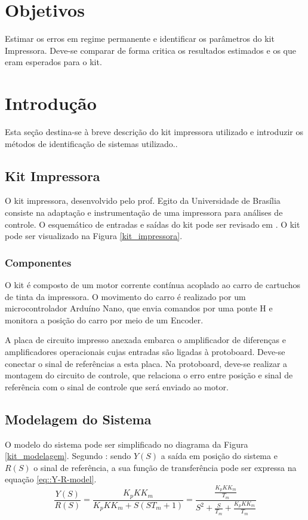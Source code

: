 \section{Objetivos}

Estimar os erros em regime permanente e identificar os parâmetros do kit Impressora. Deve-se comparar de forma critica os resultados estimados e os que eram esperados para o kit.

\section{Introdução}
Esta seção destina-se à breve descrição do kit impressora utilizado e introduzir os métodos de identificação de sistemas utilizado..

\subsection{Kit Impressora}
O kit impressora, desenvolvido pelo prof. Egito da Universidade de Brasília consiste na adaptação e instrumentação de uma impressora para análises de controle.  O esquemático de entradas e saídas do kit pode ser revisado em \cite{CDIN:Roteiro1}. O kit pode ser visualizado na Figura \ref{kit_impressora}.



\subsubsection{Componentes}
O kit é composto de um motor  corrente contínua acoplado ao carro de cartuchos de tinta da impressora. O movimento do carro é realizado por um microcontrolador Arduíno Nano, que envia comandos por uma ponte H e monitora a posição do carro por meio de um Encoder. 

A placa de circuito impresso anexada embarca o amplificador de diferenças e amplificadores operacionais cujas entradas são ligadas à protoboard. Deve-se conectar o sinal de referências a esta placa. Na protoboard, deve-se realizar a montagem do circuito de controle, que relaciona o erro entre posição e sinal de referência com o sinal de controle que será enviado ao motor.

\subsection{Modelagem do Sistema}
O modelo do sistema pode ser simplificado no diagrama da Figura \ref{kit_modelagem}. Segundo \cite{CDIN:Roteiro1}: sendo $Y(S)$ a saída em posição do sistema e $R(S)$ o sinal de referência, a sua função de transferência pode ser expressa na equação \ref{eq::Y-R-model}.
\begin{equation}
\frac{Y(S)}{R(S)} = \frac{ K_p K K_m  }{ K_p K K_m + S(ST_m +1) } = \frac{\frac{K_p K K_m}{T_m}}{S^2+ \frac{S}{T_m}+ \frac{K_p K K_m}{T_m}} 
\label{eq::Y-R-model}
\end{equation}

